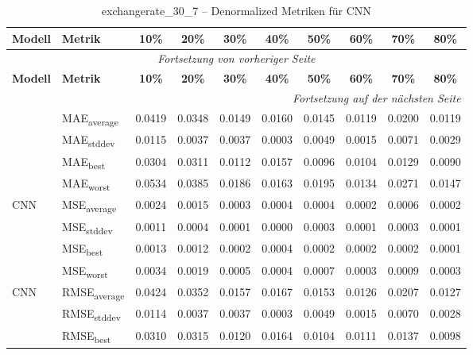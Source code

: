 {\small
\begin{longtable}{l l c c c c c c c c}
    \toprule
    \textbf{Modell} & \textbf{Metrik} & \textbf{10\%} & \textbf{20\%} & \textbf{30\%} & \textbf{40\%} & \textbf{50\%} & \textbf{60\%} & \textbf{70\%} & \textbf{80\%} \\
    \midrule
    \endfirsthead
    \multicolumn{10}{c}{\textit{Fortsetzung von vorheriger Seite}} \\
    \toprule
    \textbf{Modell} & \textbf{Metrik} & \textbf{10\%} & \textbf{20\%} & \textbf{30\%} & \textbf{40\%} & \textbf{50\%} & \textbf{60\%} & \textbf{70\%} & \textbf{80\%} \\
    \midrule
    \endhead
    \midrule
    \multicolumn{10}{r}{\textit{Fortsetzung auf der nächsten Seite}} \\
    \midrule
    \endfoot
    \bottomrule
    \caption{exchangerate_30_7 -- Denormalized Metriken für CNN}
    \label{tab:exchangerate_30_7_denormalized_cnn}
    \endlastfoot
\multirow{4}{*}{CNN} & MAE\textsubscript{average} & 0.0419 & 0.0348 & 0.0149 & 0.0160 & 0.0145 & 0.0119 & 0.0200 & 0.0119 \\
 & MAE\textsubscript{stddev} & 0.0115 & 0.0037 & 0.0037 & 0.0003 & 0.0049 & 0.0015 & 0.0071 & 0.0029 \\
 & MAE\textsubscript{best} & 0.0304 & 0.0311 & 0.0112 & 0.0157 & 0.0096 & 0.0104 & 0.0129 & 0.0090 \\
 & MAE\textsubscript{worst} & 0.0534 & 0.0385 & 0.0186 & 0.0163 & 0.0195 & 0.0134 & 0.0271 & 0.0147 \\
\cmidrule(lr){2-10}
\multirow{4}{*}{CNN} & MSE\textsubscript{average} & 0.0024 & 0.0015 & 0.0003 & 0.0004 & 0.0004 & 0.0002 & 0.0006 & 0.0002 \\
 & MSE\textsubscript{stddev} & 0.0011 & 0.0004 & 0.0001 & 0.0000 & 0.0003 & 0.0001 & 0.0003 & 0.0001 \\
 & MSE\textsubscript{best} & 0.0013 & 0.0012 & 0.0002 & 0.0004 & 0.0002 & 0.0002 & 0.0002 & 0.0001 \\
 & MSE\textsubscript{worst} & 0.0034 & 0.0019 & 0.0005 & 0.0004 & 0.0007 & 0.0003 & 0.0009 & 0.0003 \\
\cmidrule(lr){2-10}
\multirow{4}{*}{CNN} & RMSE\textsubscript{average} & 0.0424 & 0.0352 & 0.0157 & 0.0167 & 0.0153 & 0.0126 & 0.0207 & 0.0127 \\
 & RMSE\textsubscript{stddev} & 0.0114 & 0.0037 & 0.0037 & 0.0003 & 0.0049 & 0.0015 & 0.0070 & 0.0028 \\
 & RMSE\textsubscript{best} & 0.0310 & 0.0315 & 0.0120 & 0.0164 & 0.0104 & 0.0111 & 0.0137 & 0.0098 \\

\end{longtable}}
